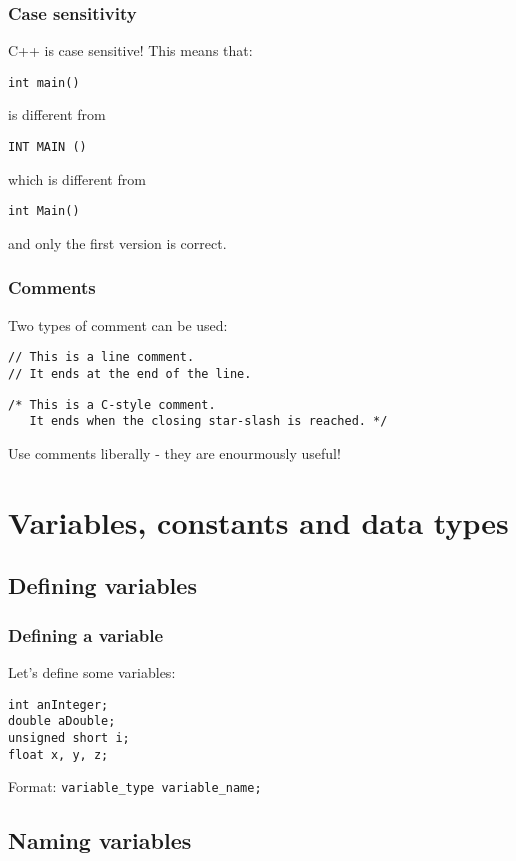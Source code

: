 \documentclass{beamer}
\begin{document}
\begin{frame}[fragile]
  \frametitle{Case sensitivity}
  C++ is case sensitive!  This means that:
  \begin{lstlisting}
int main()
  \end{lstlisting}
  is different from
  \begin{lstlisting}
INT MAIN ()
  \end{lstlisting}
  which is different from
  \begin{lstlisting}
int Main()
  \end{lstlisting}
  and only the first version is correct.
\end{frame}

\begin{frame}[fragile]
  \frametitle{Comments}
  Two types of comment can be used:
  \begin{lstlisting}
// This is a line comment.
// It ends at the end of the line.
  \end{lstlisting}
  \begin{lstlisting}
/* This is a C-style comment.
   It ends when the closing star-slash is reached. */
  \end{lstlisting}
    Use comments liberally - they are enourmously useful!
\end{frame}

\section{Variables, constants and data types}

\subsection{Defining variables}

\begin{frame}[fragile]
\frametitle{Defining a variable}
  Let's define some variables:
  \begin{lstlisting}
int anInteger;
double aDouble;
unsigned short i;
float x, y, z;
  \end{lstlisting}
Format: \texttt{\textcolor{bluekeywords}{variable\_type} variable\_name;}

\end{frame}

\subsection{Naming variables}
\end{document}
